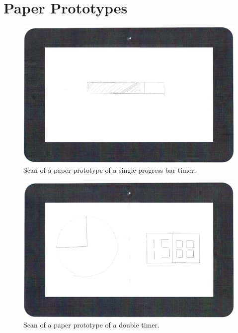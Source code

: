 

	




\section{Paper Prototypes}
	\label{sec:paper_prot}

	\begin{figure}[H]
		\centering
			\includegraphics[width=\textwidth]{Images/paper_prototype/timer_1.png}
				\caption{Scan of a paper prototype of a single progress bar timer.}
		\label{fig:pap_prot_progbar}
	\end{figure}
	
	\begin{figure}[H]
		\centering
			\includegraphics[width=\textwidth]{Images/paper_prototype/timer_2.png}
				\caption{Scan of a paper prototype of a double timer.}
		\label{fig:pap_prot_timedoub1}
	\end{figure}

